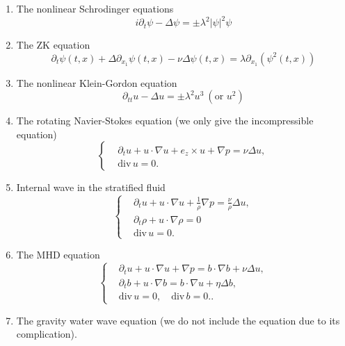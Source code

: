 \begin{enumerate}
    \item The nonlinear Schrodinger equations
    \begin{equation}\label{eq.NLS}
        i\partial_t\psi-\Delta\psi=\pm\lambda^2 |\psi|^2\psi
    \end{equation}
    \item The ZK equation
    \begin{equation}\label{eq.ZK}
        \partial_t\psi(t,x)+\Delta\partial_{x_1}\psi(t,x)-\nu \Delta \psi(t,x)=\lambda \partial_{x_1}(\psi^2(t,x))
    \end{equation}
    \item The nonlinear Klein-Gordon equation
    \begin{equation}\label{eq.KG}
        \partial_{tt}u-\Delta u=\pm\lambda^2 u^3 \ (\text{or } u^2)
    \end{equation}
    \item The rotating Navier-Stokes equation (we only give the incompressible equation)
    \begin{equation}\label{eq.rNS}
        \left\{
        \begin{aligned}
            &\partial_t u + u\cdot \nabla u + e_z\times u + \nabla p = \nu \Delta u,
            \\
            & \text{div}\, u = 0.
        \end{aligned}\right.
    \end{equation}
    \item Internal wave in the stratified fluid
    \begin{equation}\label{eq.SF}
        \left\{
        \begin{aligned}
            &\partial_t u + u\cdot \nabla u + \frac{1}{\rho}\nabla p = \frac{\nu}{\rho} \Delta u,
            \\
            & \partial_t\rho +u\cdot\nabla\rho = 0
            \\
            & \text{div}\, u = 0.
        \end{aligned}\right.
    \end{equation}
    \item The MHD equation
    \begin{equation}\label{eq.MHD}
        \left\{
        \begin{aligned}
            &\partial_t u + u\cdot \nabla u + \nabla p = b\cdot\nabla b + \nu \Delta u,
            \\
            & \partial_t b + u\cdot \nabla b  = b\cdot\nabla u + \eta \Delta b,
            \\
            & \text{div}\, u = 0,\quad \text{div}\, b = 0..
        \end{aligned}\right.
    \end{equation}
    \item The gravity water wave equation (we do not include the equation due to its complication). 
\end{enumerate}

